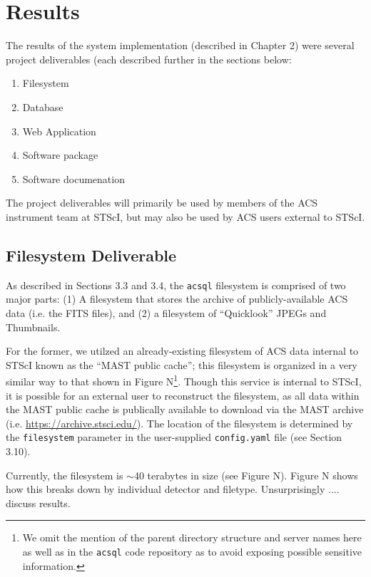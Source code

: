 \documentclass[10pt,journal,compsoc]{IEEEtran}
\begin{document}
\section{Results}\label{sec:results}

The results of the system implementation (described in Chapter 2) were several project deliverables (each described further in the
sections below:

\begin{enumerate}
\item Filesystem
\item Database
\item Web Application
\item Software package
\item Software documenation
\end{enumerate}


The project deliverables will primarily be used by members of the ACS instrument team at STScI, but may also be used
by ACS users external to STScI.


\subsection{Filesystem Deliverable}

As described in Sections 3.3 and 3.4, the \texttt{acsql} filesystem is comprised of two major parts: (1) A filesystem
that stores the archive of publicly-available ACS data (i.e. the FITS files), and (2) a filesystem of ``Quicklook''
JPEGs and Thumbnails.

For the former, we utilzed an already-existing filesystem of ACS data internal to STScI known as the ``MAST public cache'';
this filesystem is organized in a very similar way to that shown in Figure N\footnote{We omit the mention of the parent
directory structure and server names here as well as in the \texttt{acsql} code repository as to avoid exposing possible
sensitive information.}.  Though this service is internal to STScI, it is possible for an external user to reconstruct the
filesystem, as all data within the MAST public cache is publically available to download via the MAST archive (i.e.
\url{https://archive.stsci.edu/}).  The location of the filesystem is determined by the \texttt{filesystem} parameter in
the user-supplied \texttt{config.yaml} file (see Section 3.10).

Currently, the filesystem is $\sim$40 terabytes in size (see Figure N). Figure N shows how this breaks down by individual
detector and filetype.  Unsurprisingly .... discuss results.
\end{document}
